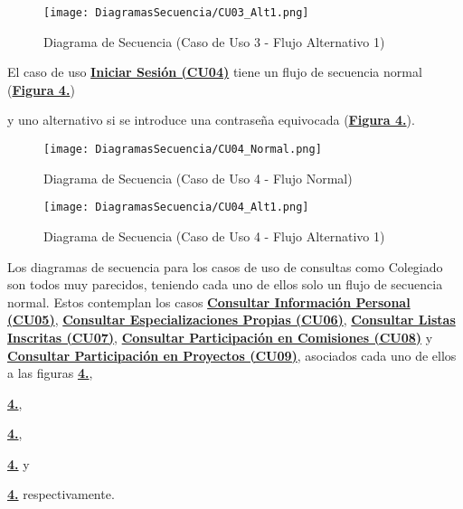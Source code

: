 \begin{landscape}
  \begin{figure}[!htbp]
    \centering
    \texttt{[image: DiagramasSecuencia/CU03\_Alt1.png]}
    \caption{Diagrama de Secuencia (Caso de Uso 3 - Flujo Alternativo 1)}
    \label{fig:Secuencia_CU3_Alt1}
  \end{figure}
\end{landscape}
\FloatBarrier

\addtocounter{figura_cap4}{1}
El caso de uso \textbf{\hyperref[tab:cucIniSes]{Iniciar Sesión (CU04)}} tiene un flujo de secuencia normal (\textbf{\hyperref[fig:Secuencia_CU4_Normal]{Figura 4.}}) \addtocounter{figura_cap4}{1} y uno alternativo si se introduce una contraseña equivocada (\textbf{\hyperref[fig:Secuencia_CU4_Alt1]{Figura 4.}}).
\begin{figure}[!htbp]
  \centering
  \texttt{[image: DiagramasSecuencia/CU04\_Normal.png]}
  \caption{Diagrama de Secuencia (Caso de Uso 4 - Flujo Normal)}
  \label{fig:Secuencia_CU4_Normal}
\end{figure}
\FloatBarrier

\begin{landscape}
  \begin{figure}[!htbp]
    \centering
    \texttt{[image: DiagramasSecuencia/CU04\_Alt1.png]}
    \caption{Diagrama de Secuencia (Caso de Uso 4 - Flujo Alternativo 1)}
    \label{fig:Secuencia_CU4_Alt1}
  \end{figure}
\end{landscape}
\FloatBarrier

\addtocounter{figura_cap4}{1}
Los diagramas de secuencia para los casos de uso de consultas como Colegiado son todos muy parecidos, teniendo cada uno de ellos solo un flujo de secuencia normal. Estos contemplan los casos \textbf{\hyperref[tab:cucConsultaInfoPersonal]{Consultar Información Personal (CU05)}}, \textbf{\hyperref[tab:cucConsultaEspec]{Consultar Especializaciones Propias (CU06)}}, \textbf{\hyperref[tab:cucConsultaLista]{Consultar Listas Inscritas (CU07)}}, \textbf{\hyperref[tab:cucConsultaComision]{Consultar Participación en Comisiones (CU08)}} y \textbf{\hyperref[tab:cucConsultaProyectos]{Consultar Participación en Proyectos (CU09)}}, asociados cada uno de ellos a las figuras \textbf{\hyperref[fig:Secuencia_CU5_Normal]{4.}}, \addtocounter{figura_cap4}{1} \textbf{\hyperref[fig:Secuencia_CU6_Normal]{4.}}, \addtocounter{figura_cap4}{1} \textbf{\hyperref[fig:Secuencia_CU7_Normal]{4.}}, \addtocounter{figura_cap4}{1} \textbf{\hyperref[fig:Secuencia_CU8_Normal]{4.}} y \addtocounter{figura_cap4}{1} \textbf{\hyperref[fig:Secuencia_CU9_Normal]{4.}} respectivamente.

